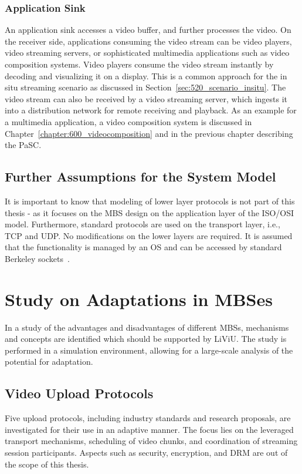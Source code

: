 \subsubsection{Application Sink}
An application sink accesses a video buffer, and further processes the video. 
On the receiver side, applications consuming the video stream can be video players, video streaming servers, or sophisticated multimedia applications such as video composition systems.
Video players consume the video stream instantly by decoding and visualizing it on a display.
This is a common approach for the in situ streaming scenario as discussed in Section~\ref{sec:520_scenario_insitu}.
The video stream can also be received by a video streaming server, which ingests it into a distribution network for remote receiving and playback.
As an example for a multimedia application, a video composition system is discussed in Chapter~\ref{chapter:600_videocomposition} and in the previous chapter describing the \ac{PaSC}.
\subsection{Further Assumptions for the System Model}
It is important to know that modeling of lower layer protocols is not part of this thesis - as it focuses on the \ac{MBS} design on the application layer of the \ac{ISO}/\ac{OSI} model.
Furthermore, standard protocols are used on the transport layer, i.e., \ac{TCP} and \ac{UDP}.
No modifications on the lower layers are required.
It is assumed that the functionality is managed by an \ac{OS} and can be accessed by standard Berkeley sockets~\cite{ISOIECIEEEStandard99452009}.
\section{Study on Adaptations in MBSes}
\label{sec:520_design_intro}
In a study of the advantages and disadvantages of different \ac{MBS}s, mechanisms and concepts are identified which should be supported by \ac{LiViU}. 
The study is performed in a simulation environment, allowing for a large-scale analysis of the potential for adaptation. 
\subsection{Video Upload Protocols}
\label{sec:520_design_upload_mechanisms}
Five upload protocols, including industry standards and research proposals, are investigated for their use in an adaptive manner. The focus lies on the leveraged transport mechanisms, scheduling of video chunks, and coordination of streaming session participants. 
Aspects such as security, encryption, and \ac{DRM} are out of the scope of this thesis.
